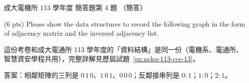 \begin{pastexam}[label={px:ncku-113-ee-13}]{成大電機所 113 學年度 簡答題第 4 題}
（簡答）

(6 pts) Please show the data structures to record the following graph in the form of adjacency
matrix and the inversed adjacency list.

\begin{center}
\end{center}
\end{pastexam}

\begin{pastsoln}
這份考卷和成大電通所 113 學年度的「資料結構」是同一份（電機系、電通所、智慧資安學程共用），完整詳解見歷屆試題~\ref{px:ncku-113-cce-13}。

答案：相鄰矩陣的三列是 $0\,1\,0$、$1\,0\,1$、$0\,0\,0$；反鄰接串列是 $0\colon 1$；$1\colon 0$；$2\colon 1$。
\end{pastsoln}
